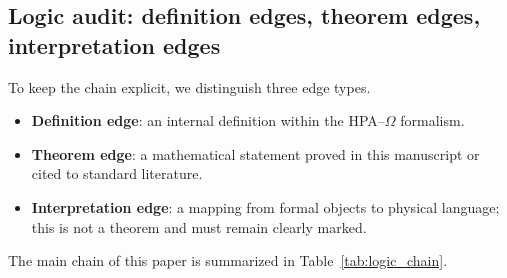 \subsection{Logic audit: definition edges, theorem edges, interpretation edges}
\label{subsec:logic_audit}
To keep the chain explicit, we distinguish three edge types.

\begin{itemize}
    \item \textbf{Definition edge}: an internal definition within the HPA--$\Omega$ formalism.
    \item \textbf{Theorem edge}: a mathematical statement proved in this manuscript or cited to standard literature.
    \item \textbf{Interpretation edge}: a mapping from formal objects to physical language; this is not a theorem and must remain clearly marked.
\end{itemize}

\noindent The main chain of this paper is summarized in Table~\ref{tab:logic_chain}.

